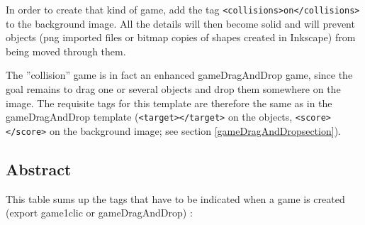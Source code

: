 In order to create that kind of game, add the tag \verb|<collisions>on</collisions>| to the 
background image. All the details will then become solid and will prevent objects 
(png imported files or bitmap copies of shapes created in Inkscape) from being moved through them.

The ''collision'' game is in fact an enhanced gameDragAndDrop game, since the goal remains to 
drag one or several objects and drop them somewhere on the image.
The requisite tags for this template are 
therefore the same as in the gameDragAndDrop template (\verb|<target></target>| on the objects, \verb|<score></score>| 
on the background image; see section \ref{gameDragAndDropsection}).

\subsection{Abstract}

This table sums up the tags that have to be indicated when a game is created 
 (export game1clic or gameDragAndDrop) :
 
